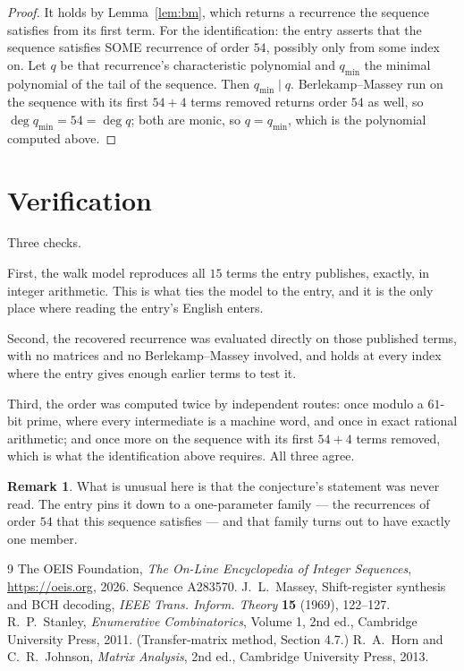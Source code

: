 \documentclass[11pt,a4paper]{article}
\theoremstyle{plain}
\theoremstyle{definition}
\newtheorem{remark}[theorem]{Remark}
\begin{document}
\begin{proof}
It holds by Lemma~\ref{lem:bm}, which returns a recurrence the sequence satisfies from its
first term. For the identification: the entry asserts that the sequence satisfies SOME
recurrence of order $54$, possibly only from some index on. Let $q$ be that recurrence's
characteristic polynomial and $q_{\min}$ the minimal polynomial of the tail of the sequence.
Then $q_{\min}\mid q$. Berlekamp--Massey run on the sequence with its first $54+4$ terms
removed returns order $54$ as well, so $\deg q_{\min}=54=\deg q$; both are monic, so
$q=q_{\min}$, which is the polynomial computed above.
\end{proof}

\section{Verification}

Three checks.

First, the walk model reproduces all $15$ terms the entry publishes, exactly, in integer
arithmetic. This is what ties the model to the entry, and it is the only place where reading
the entry's English enters.

Second, the recovered recurrence was evaluated directly on those published terms, with no
matrices and no Berlekamp--Massey involved, and holds at every index where the entry gives
enough earlier terms to test it.

Third, the order was computed twice by independent routes: once modulo a $61$-bit prime, where
every intermediate is a machine word, and once in exact rational arithmetic; and once more on
the sequence with its first $54+4$ terms removed, which is what the identification above
requires. All three agree.

\begin{remark}
What is unusual here is that the conjecture's statement was never read. The entry pins it down
to a one-parameter family --- the recurrences of order $54$ that this sequence satisfies
--- and that family turns out to have exactly one member.
\end{remark}

\begin{thebibliography}{9}
 The OEIS Foundation, \emph{The On-Line Encyclopedia of Integer
Sequences}, \url{https://oeis.org}, 2026. Sequence A283570.
 J.~L.~Massey, Shift-register synthesis and BCH decoding, \emph{IEEE
Trans. Inform. Theory} \textbf{15} (1969), 122--127.
 R.~P.~Stanley, \emph{Enumerative Combinatorics}, Volume 1, 2nd ed.,
Cambridge University Press, 2011. (Transfer-matrix method, Section 4.7.)
 R.~A.~Horn and C.~R.~Johnson, \emph{Matrix Analysis}, 2nd ed., Cambridge
University Press, 2013.
\end{thebibliography}
\end{document}
